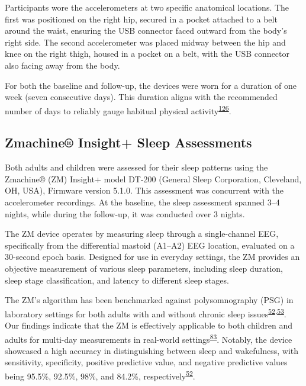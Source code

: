 \documentclass[
  10pt,
]{scrbook}
\begin{document}
Participants wore the accelerometers at two specific anatomical
locations. The first was positioned on the right hip, secured in a
pocket attached to a belt around the waist, ensuring the USB connector
faced outward from the body's right side. The second accelerometer was
placed midway between the hip and knee on the right thigh, housed in a
pocket on a belt, with the USB connector also facing away from the body.

For both the baseline and follow-up, the devices were worn for a
duration of one week (seven consecutive days). This duration aligns with
the recommended number of days to reliably gauge habitual physical
activity\textsuperscript{\protect\hyperlink{ref-jaeschke_variability_2018}{126}}.

\hypertarget{zmachine-insight-sleep-assessments}{%
\subsection{Zmachine® Insight+ Sleep
Assessments}\label{zmachine-insight-sleep-assessments}}

Both adults and children were assessed for their sleep patterns using
the Zmachine® (ZM) Insight+ model DT-200 (General Sleep Corporation,
Cleveland, OH, USA), Firmware version 5.1.0. This assessment was
concurrent with the accelerometer recordings. At the baseline, the sleep
assessment spanned 3--4 nights, while during the follow-up, it was
conducted over 3 nights.

The ZM device operates by measuring sleep through a single-channel EEG,
specifically from the differential mastoid (A1--A2) EEG location,
evaluated on a 30-second epoch basis. Designed for use in everyday
settings, the ZM provides an objective measurement of various sleep
parameters, including sleep duration, sleep stage classification, and
latency to different sleep stages.

The ZM's algorithm has been benchmarked against polysomnography (PSG) in
laboratory settings for both adults with and without chronic sleep
issues\textsuperscript{\protect\hyperlink{ref-kaplan_performance_2014}{52},\protect\hyperlink{ref-wang_evaluation_2015}{53}}.
Our findings indicate that the ZM is effectively applicable to both
children and adults for multi-day measurements in real-world
settings\textsuperscript{\protect\hyperlink{ref-hees_novel_2015}{83}}.
Notably, the device showcased a high accuracy in distinguishing between
sleep and wakefulness, with sensitivity, specificity, positive
predictive value, and negative predictive values being 95.5\%, 92.5\%,
98\%, and 84.2\%,
respectively\textsuperscript{\protect\hyperlink{ref-kaplan_performance_2014}{52}}.
\end{document}
